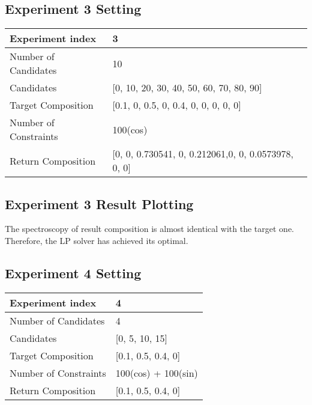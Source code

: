 \subsection{Experiment 3 Setting}

\begin{table}
\begin{tabular}{l | p{7cm} | }
\hline
Experiment index & 3  \\
\hline
Number of Candidates & 10   \\
\hline
Candidates & [0, 10, 20, 30, 40, 50, 60, 70, 80, 90]  \\
\hline
Target Composition & [0.1, 0, 0.5, 0, 0.4, 0, 0, 0, 0, 0] \\
\hline
Number of Constraints & 100(cos) \\
\hline
Return Composition & [0, 0, 0.730541, 0, 0.212061,0, 0, 0.0573978, 0, 0] \\
\hline
\end{tabular} 
\end{table}	


\subsection{Experiment 3 Result Plotting}


The spectroscopy of result composition is almost identical with the target one. Therefore, the LP solver has achieved its optimal.


\subsection{Experiment 4 Setting}

\begin{table}
\begin{tabular}{l | p{7cm} | }
\hline
Experiment index & 4  \\
\hline
Number of Candidates & 4   \\
\hline
Candidates & [0, 5, 10, 15]  \\
\hline
Target Composition & [0.1, 0.5, 0.4, 0] \\
\hline
Number of Constraints & 100(cos) + 100(sin) \\
\hline
Return Composition & [0.1, 0.5, 0.4, 0] \\
\hline
\end{tabular} 
\end{table}		


